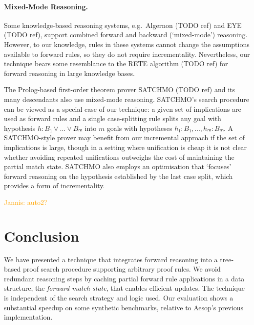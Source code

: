 \documentclass[runningheads]{llncs}
\newcommand{\jcom}[1]{{\textcolor{orange}{Jannis: #1}} }
\begin{document}
\paragraph{Mixed-Mode Reasoning.}
Some knowledge-based reasoning systems, e.g.\ Algernon (TODO ref) and EYE (TODO ref), support combined forward and backward (\enquote*{mixed-mode}) reasoning.
However, to our knowledge, rules in these systems cannot change the assumptions available to forward rules, so they do not require incrementality.
Nevertheless, our technique bears some resemblance to the RETE algorithm (TODO ref) for forward reasoning in large knowledge bases.

The Prolog-based first-order theorem prover SATCHMO (TODO ref) and its many descendants also use mixed-mode reasoning.
SATCHMO's search procedure can be viewed as a special case of our technique: a given set of implications are used as forward rules and a single case-splitting rule splits any goal with hypothesis $h : B₁ ∨ \dots ∨ Bₘ$ into $m$ goals with hypotheses $h₁ : B₁, \dots, hₘ : Bₘ$.
A SATCHMO-style prover may benefit from our incremental approach if the set of implications is large, though in a setting where unification is cheap it is not clear whether avoiding repeated unifications outweighs the cost of maintaining the partial match state.
SATCHMO also employs an optimisation that \enquote*{focuses} forward reasoning on the hypothesis established by the last case split, which provides a form of incrementality.

\jcom{auto2?}

\section{Conclusion}

We have presented a technique that integrates forward reasoning into a tree-based proof search procedure supporting arbitrary proof rules.
We avoid redundant reasoning steps by caching partial forward rule applications in a data structure, the \emph{forward match state}, that enables efficient updates.
The technique is independent of the search strategy and logic used.
Our evaluation shows a substantial speedup on some synthetic benchmarks, relative to Aesop's previous implementation.
\end{document}
